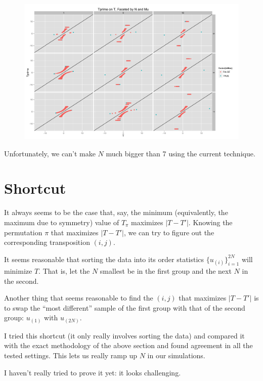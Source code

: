 \documentclass{amsart}
\begin{document}
\begin{figure}[!ht]
  \centering
  \includegraphics[scale=.12]{t_tprime_plot.png}
\end{figure}

Unfortunately, we can't make $N$ much bigger than 7 using the current
technique.  
\clearpage

\section{Shortcut}
It always seems to be the case that, say, the minimum (equivalently,
the maximum due to symmetry) value of $T_{\pi}$ maximizes $|T - T'|$.
Knowing the permutation $\pi$ that maximizes $|T - T'|$, we can try to
figure out the corresponding transposition $(i, j)$.  

It seems reasonable that sorting the data into its order statistics
$\{u_{(i)}\}_{i=1}^{2N}$ will minimize $T$.  That is, let the $N$
smallest be in the first group and the next $N$ in the second.  

Another thing that seems reasonable to find the $(i, j)$ that maximizes
$|T - T'|$ is to swap the ``most different'' sample of the first group
with that of the second group: $u_{(1)}$ with $u_{(2N)}$.

I tried this shortcut (it only really involves sorting the data) and
compared it with the exact methodology of the above section and found
agreement in all the tested settings.  This lets us really ramp up $N$
in our simulations.

I haven't really tried to prove it yet: it looks challenging.
\end{document}
